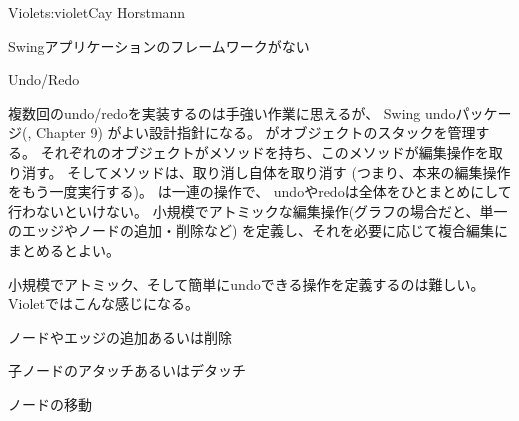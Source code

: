 \begin{aosachapter}{Violet}{s:violet}{Cay Horstmann}
\begin{aosasect1}{Swingアプリケーションのフレームワークがない}
\end{aosasect1}

\begin{aosasect1}{Undo/Redo}

複数回のundo/redoを実装するのは手強い作業に思えるが、
Swing undoパッケージ(\cite{bib:topley:coreswing}, Chapter 9)
がよい設計指針になる。
がオブジェクトのスタックを管理する。
それぞれのオブジェクトがメソッドを持ち、このメソッドが編集操作を取り消す。
そしてメソッドは、取り消し自体を取り消す
(つまり、本来の編集操作をもう一度実行する)。
は一連の操作で、
undoやredoは全体をひとまとめにして行わないといけない。
小規模でアトミックな編集操作(グラフの場合だと、単一のエッジやノードの追加・削除など)
を定義し、それを必要に応じて複合編集にまとめるとよい。

小規模でアトミック、そして簡単にundoできる操作を定義するのは難しい。
Violetではこんな感じになる。

\begin{aosaitemize}

  \item ノードやエッジの追加あるいは削除

  \item 子ノードのアタッチあるいはデタッチ

  \item ノードの移動


\end{aosaitemize}
\end{aosasect1}
\end{aosachapter}
